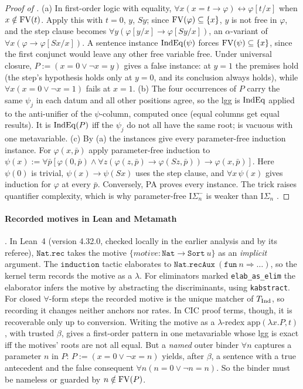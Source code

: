 \begin{proof}[Proof of ]
(a) In first-order logic with equality, $\forall x(x=t\to\varphi)\leftrightarrow\varphi[t/x]$ when $x\notin\mathrm{FV}(t)$. Apply
this with $t=0$, $y$, $Sy$; since $\mathrm{FV}(\varphi)\subseteq\{x\}$, $y$ is not free in $\varphi$, and the step clause becomes
$\forall y(\varphi[y/x]\to\varphi[Sy/x])$, an $\alpha$-variant of $\forall x(\varphi\to\varphi[Sx/x])$. A sentence
instance $\mathrm{IndEq}(\psi)$ forces $\mathrm{FV}(\psi)\subseteq\{x\}$, since the first conjunct would leave any other free variable
free. Under universal closure, $P:=(x=0\vee\neg x=y)$ gives a false instance: at $y=1$ the premises hold (the step's
hypothesis holds only at $y=0$, and its conclusion always holds), while $\forall x(x=0\vee\neg x=1)$ fails at $x=1$.
(b) The four occurrences of $P$ carry the same $\psi_j$ in each datum and all other positions agree, so the lgg is
$\mathrm{IndEq}$ applied to the anti-unifier of the $\psi$-column, computed once (equal columns get equal results). It is
$\mathrm{IndEq}(P)$ iff the $\psi_j$ do not all have the same root; \evD{} is vacuous with one metavariable.
(c) By (a) the instances give every parameter-free induction instance. For $\varphi(x,\bar p)$ apply parameter-free
induction to $\psi(x):=\forall\bar p[\varphi(0,\bar p)\wedge\forall z(\varphi(z,\bar p)\to\varphi(Sz,\bar
p))\to\varphi(x,\bar p)]$. Here $\psi(0)$ is trivial, $\psi(x)\to\psi(Sx)$ uses the step clause, and $\forall x\,\psi(x)$
gives induction for $\varphi$ at every $\bar p$. Conversely, PA proves every instance. The trick raises quantifier
complexity, which is why parameter-free $\mathrm{I}\Sigma_n^-$ is weaker than $\mathrm{I}\Sigma_n$
\citep{kaye1988parameter}.
\end{proof}

\paragraph{Recorded motives in Lean and Metamath} .
In Lean~4 (version 4.32.0, checked locally in the earlier analysis and by its referee), $\mathtt{Nat.rec}$ takes the motive
$\{\mathit{motive}:\mathtt{Nat}\to\mathtt{Sort}\ u\}$ as an \emph{implicit} argument. The $\mathtt{induction}$ tactic
elaborates to $\mathtt{Nat.recAux}\ (\mathtt{fun}\ n\Rightarrow\dots)$, so the kernel term records the motive as a
$\lambda$. For eliminators marked \texttt{elab\_as\_elim} the elaborator infers the motive by abstracting the
discriminants, using \texttt{kabstract}. For closed
$\forall$-form steps the recorded motive is the unique matcher of $T_{\mathrm{Ind}}$, so recording it changes neither anchors
nor rates. In CIC proof terms, though, it is recoverable only up to conversion. Writing the motive as a $\lambda$-redex
$\mathrm{app}(\lambda x.P,t)$, with trusted $\beta$, gives a first-order pattern in one metavariable whose lgg is exact
iff the motives' roots are not all equal. But a \emph{named} outer binder $\forall n$ captures a parameter $n$ in $P$:
$P:=(x=0\vee\neg x=n)$ yields, after $\beta$, a sentence with a true antecedent and the false consequent $\forall
n(n=0\vee\neg n=n)$. So the binder must be nameless or guarded by $n\notin\mathrm{FV}(P)$.

